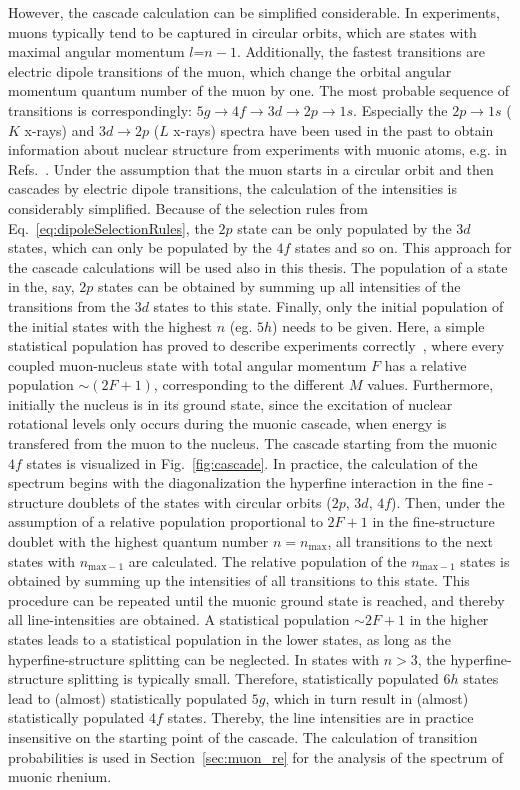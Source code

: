 However, the cascade calculation can be simplified considerable. In experiments, muons typically tend to be captured in circular orbits, which are states with maximal angular momentum $l$=$n-1$. Additionally, the fastest transitions are electric dipole transitions of the muon, which change the orbital angular momentum quantum number of the muon by one. The most probable sequence of transitions is correspondingly: $5g\rightarrow 4f \rightarrow 3d \rightarrow 2p \rightarrow 1s$. Especially the $2p\rightarrow 1s$ ($K$ x-rays) and $3d\rightarrow 2p$ ($L$ x-rays) spectra have been used in the past to obtain information about nuclear structure from experiments with muonic atoms, e.g. in Refs.~\cite{tanaka1983,tanaka1984,tanaka1984_2,hitlin1970,Dey1979,dewit1966,Bergem1988}. Under the assumption that the muon starts in a circular orbit and then cascades by electric dipole transitions, the calculation of the intensities is considerably simplified. Because of the selection rules from Eq.~\eqref{eq:dipoleSelectionRules}, the $2p$ state can be only populated by the $3d$ states, which can only be populated by the $4f$ states and so on. This approach for the cascade calculations will be used also in this thesis. The population of a state in the, say, $2p$ states can be obtained by summing up all intensities of the transitions from the $3d$ states to this state. Finally, only the initial population of the initial states with the highest $n$ (eg. $5h$) needs to be given. Here, a simple statistical population has proved to describe experiments correctly~\cite{Dey1979}, where every coupled muon-nucleus state with total angular momentum $F$ has a relative population $\sim (2F+1)$, corresponding to the different $M$ values. Furthermore, initially the nucleus is in its ground state, since the excitation of nuclear rotational levels only occurs during the muonic cascade, when energy is transfered from the muon to the nucleus.
The cascade starting from the muonic $4f$ states is visualized in Fig.~\ref{fig:cascade}. In practice, the calculation of the spectrum begins with the diagonalization the hyperfine interaction in the fine -structure doublets of the states with circular orbits ($2p$, $3d$, $4f$). Then, under the assumption of a relative population proportional to $2F+1$ in the fine-structure doublet with the highest quantum number $n=n_{\text{max}}$, all transitions to the next states with $n_{\text{max}-1}$ are calculated. The relative population of the $n_{\text{max}-1}$ states is obtained by summing up the intensities of all transitions to this state. This procedure can be repeated until the muonic ground state is reached, and thereby all line-intensities are obtained. A statistical population $\sim 2F+1$ in the higher states leads to a statistical population in the lower states, as long as the hyperfine-structure  splitting can be neglected. In states with $n>3$, the hyperfine-structure splitting is typically small. Therefore, statistically populated $6h$ states lead to (almost) statistically populated $5g$, which in turn result in (almost) statistically populated $4f$ states. Thereby, the line intensities are in practice insensitive on the starting point of the cascade. The calculation of transition probabilities is used in Section~\ref{sec:muon_re} for the analysis of the spectrum of muonic rhenium.
